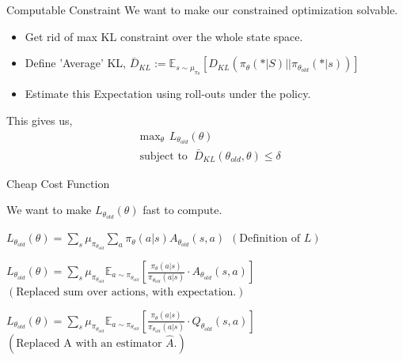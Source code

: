 \documentclass{beamer}
\begin{document}
\begin{frame}{Computable Constraint}
We want to make our constrained optimization solvable.

\begin{itemize}
    \item Get rid of max KL constraint over the whole state space. 
    \item Define 'Average' KL, $\bar{D}_{KL} := \mathbb{E}_{s \sim \mu_{\pi_{\theta}}} \left[ D_{KL}\left(\pi_{\theta}(* \vert S) \vert\vert \pi_{\theta_{old}}(*\lvert s) \right) \right] $
    \item Estimate this Expectation using roll-outs under the policy.
\end{itemize}

This gives us, 
\begin{align*}
     &\text{max}_{\theta} \hspace{5pt} L_{\theta_{old}}(\theta) \\
     &\text{subject to }  \hspace{3pt} \bar{D}_{KL}\left(\theta_{old}, \theta \right) \leq \delta
\end{align*}


\end{frame}

\begin{frame}{Cheap Cost Function}

We want to make $L_{\theta_{old}}(\theta)$ fast to compute. 

\begin{itemize}
    {\item $L_{\theta_{old}}(\theta) = \sum_{s} \mu_{\pi_{\theta_{old}}} \sum_a \pi_{\theta}(a \vert s) A_{\theta_{old}}(s,a) \hspace{5pt} \left(\text{Definition of $L$}\right)$}
    {\item $L_{\theta_{old}}(\theta) = \sum_{s} \mu_{\pi_{\theta_{old}}} \mathbb{E}_{a \sim \pi_{\theta_{old}}} \left[ \frac{\pi_{\theta}(a \vert s)}{\pi_{\theta_{old}}(a \vert s)} \cdot A_{\theta_{old}}(s,a) \right] $ $\left( \text{Replaced sum over actions, with expectation}. \right)$}
   {\item  $L_{\theta_{old}}(\theta) = \sum_{s} \mu_{\pi_{\theta_{old}}} \mathbb{E}_{a \sim \pi_{\theta_{old}}} \left[ \frac{\pi_{\theta}(a \vert s)}{\pi_{\theta_{old}}( a \vert s)} \cdot Q_{\theta_{old}}(s,a) \right] $ $\left( \text{Replaced A with an estimator $\hat{A}$}. \right)$ }
\end{itemize}
\end{frame}
\end{document}
